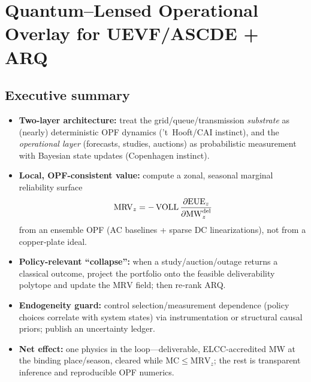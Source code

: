 \documentclass[11pt]{article}
\newcommand{\VOLL}{\ensuremath{\mathrm{VOLL}}}
\newcommand{\EUE}{\ensuremath{\mathrm{EUE}}}
\newcommand{\MRV}{\ensuremath{\mathrm{MRV}}}
\newcommand{\MC}{\ensuremath{\mathrm{MC}}}
\numberwithin{equation}{section}
\theoremstyle{definition}
\theoremstyle{remark}
\begin{document}
\section{Quantum–Lensed Operational Overlay for UEVF/ASCDE + ARQ}
\label{sec:quantum-overlay}

\subsection*{Executive summary}
\begin{itemize}[leftmargin=1.2em]
  \item \textbf{Two-layer architecture:} treat the grid/queue/transmission \emph{substrate} as (nearly) deterministic OPF dynamics (’t~Hooft/CAI instinct), and the \emph{operational layer} (forecasts, studies, auctions) as probabilistic measurement with Bayesian state updates (Copenhagen instinct).
  \item \textbf{Local, OPF-consistent value:} compute a zonal, seasonal marginal reliability surface
  \[
    \MRV_{z} = -\,\VOLL \,\frac{\partial \EUE_{z}}{\partial \MWdel_{z}}
  \]
  from an ensemble OPF (AC baselines + sparse DC linearizations), not from a copper‑plate ideal.
  \item \textbf{Policy-relevant “collapse”:} when a study/auction/outage returns a classical outcome, project the portfolio onto the feasible deliverability polytope and update the \(\MRV\) field; then re‑rank ARQ.
  \item \textbf{Endogeneity guard:} control selection/measurement dependence (policy choices correlate with system states) via instrumentation or structural causal priors; publish an uncertainty ledger.
  \item \textbf{Net effect:} one physics in the loop—deliverable, ELCC‑accredited MW at the binding place/season, cleared while \(\MC \le \MRV_{z}\); the rest is transparent inference and reproducible OPF numerics.
\end{itemize}
\end{document}
